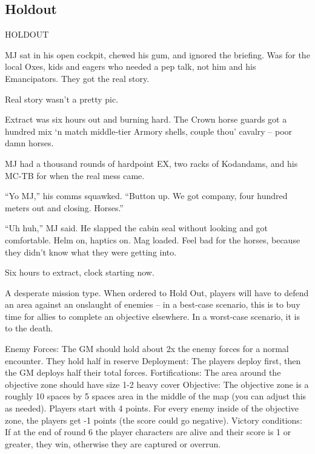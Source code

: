 \subsection{Holdout}

HOLDOUT

          MJ sat in his open cockpit, chewed his gum, and ignored the briefing. Was for the local Oxes, kids
          and eagers who needed a pep talk, not him and his Emancipators. They got the real story.

          Real story wasn’t a pretty pic.

          Extract was six hours out and burning hard. The Crown horse guards got a hundred mix ‘n match
          middle-tier Armory shells, couple thou’ cavalry -- poor damn horses.

          MJ had a thousand rounds of hardpoint EX, two racks of Kodandams, and his MC-TB for when the
          real mess came.

          “Yo MJ,” his comms squawked. “Button up. We got company, four hundred meters out and closing.
          Horses.”

          “Uh huh,” MJ said. He slapped the cabin seal without looking and got comfortable. Helm on, haptics
          on. Mag loaded. Feel bad for the horses, because they didn’t know what they were getting into.

          Six hours to extract, clock starting now.

A desperate mission type. When ordered to Hold Out, players will have to defend an area against
an onslaught of enemies -- in a best-case scenario, this is to buy time for allies to complete an
objective elsewhere. In a worst-case scenario, it is to the death.




Enemy Forces: The GM should hold about 2x the enemy forces for a normal encounter. They
hold half in reserve
Deployment: The players deploy first, then the GM deploys half their total forces.
Fortifications: The area around the objective zone should have size 1-2 heavy cover
Objective: The objective zone is a roughly 10 spaces by 5 spaces area in the middle of the map
(you can adjust this as needed). Players start with 4 points. For every enemy inside of the
objective zone, the players get -1 points (the score could go negative).
Victory conditions:  If at the end of round 6 the player characters are alive and their score is 1 or
greater, they win, otherwise they are captured or overrun.



